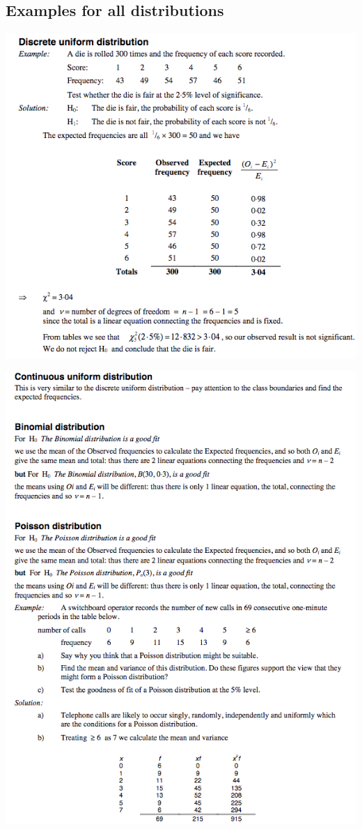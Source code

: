 \documentclass[a4paper]{article}
\begin{document}
\subsection{Examples for all distributions}
\begin{center}
	\includegraphics[scale=0.5]{img_S/19_eg1}
\end{center}
\begin{center}
	\includegraphics[scale=0.5]{img_S/19_eg2}
\end{center}
\end{document}
